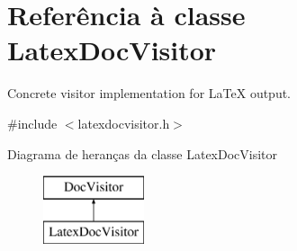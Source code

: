\hypertarget{class_latex_doc_visitor}{\section{Referência à classe Latex\-Doc\-Visitor}
\label{class_latex_doc_visitor}
}


Concrete visitor implementation for La\-Te\-X output.  




{\ttfamily \#include $<$latexdocvisitor.\-h$>$}

Diagrama de heranças da classe Latex\-Doc\-Visitor\begin{figure}[H]
\begin{center}
\leavevmode
\includegraphics[height=2.000000cm]{class_latex_doc_visitor}
\end{center}
\end{figure}
